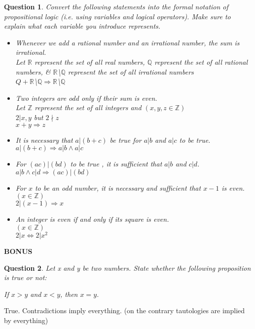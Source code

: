 \documentclass{article}
\newtheorem{question}{Question}
\begin{document}
\begin{question}
    Convert the following statements into the formal notation of propositional logic (i.e. using variables and logical operators). Make sure to explain what each variable you introduce represents.

    \begin{itemize}
      \item Whenever we add a rational number and an irrational number, the sum is irrational. \\
          \emph{Let $\mathbb{R}$ represent the set of all real numbers, $\mathbb{Q}$ represent the set of all rational numbers, \& $\mathbb{R}$\textbackslash $\mathbb{Q}$ represent the set of all irrational numbers} \\
          $Q + \mathbb{R}$\textbackslash $\mathbb{Q} \Rightarrow \mathbb{R}$\textbackslash $\mathbb{Q}$

      \item Two integers are odd only if their sum is even. \\
          \emph{Let $\mathbb{Z}$ represent the set of all integers and $(x,y,z \in \mathbb{Z})$} \\
          \emph{$2|x,y$ but $2 \nmid z$} \\
          $x + y \Rightarrow z$

      \item It is necessary that $a|(b+c)$ be true for $a|b$ and $a|c$ to be true. \\
          $a|(b + c) \Rightarrow a|b \wedge a|c$

      \item For $(ac)|(bd)$ to be true , it is sufficient that $a|b$ and $c|d$. \\
          $a|b \wedge c|d \Rightarrow (ac)|(bd)$

      \item For $x$ to be an odd number, it is necessary and sufficient that $x-1$ is even. \\
          $(x \in \mathbb{Z})$ \\
          $2|(x - 1) \Rightarrow x$

      \item An integer is even if and only if its square is even. \\
          $(x \in \mathbb{Z})$ \\
          $ 2|x \Leftrightarrow 2|x^2$

    \end{itemize}
\end{question}

\centerline{\bf BONUS}
\begin{question}
    Let x and y be two numbers. State whether the following proposition is true or not: \\
        \centerline{If $x > y$ and $x < y$, then $x = y$.}
\end{question}

True. Contradictions imply everything. (on the contrary tautologies are implied by everything)
\end{document}
